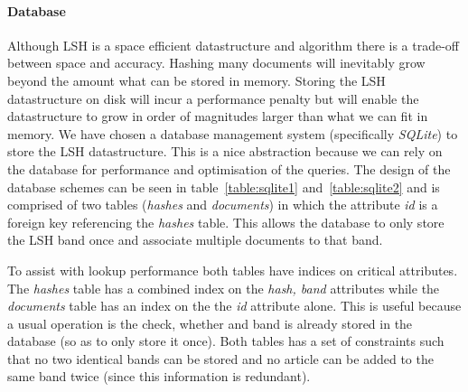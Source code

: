 \paragraph{Database}
Although LSH is a space efficient datastructure and algorithm there is a trade-off between space and accuracy. Hashing many documents will inevitably grow beyond the amount what can be stored in memory. Storing the LSH datastructure on disk will incur a performance penalty but will enable the datastructure to grow in order of magnitudes larger than what we can fit in memory. We have chosen a database management system (specifically \emph{SQLite}) to store the LSH datastructure. This is a nice abstraction because we can rely on the database for performance and optimisation of the queries. The design of the database schemes can be seen in table~\ref{table:sqlite1} and~\ref{table:sqlite2} and is comprised of two tables (\emph{hashes} and \emph{documents}) in which the attribute \emph{id} is a foreign key referencing the \emph{hashes} table. This allows the database to only store the LSH band once and associate multiple documents to that band.

To assist with lookup performance both tables have indices on critical attributes. The \emph{hashes} table has a combined index on the \emph{hash, band} attributes while the \emph{documents} table has an index on the the \emph{id} attribute alone. This is useful because a usual operation is the check, whether and band is already stored in the database (so as to only store it once). Both tables has a set of constraints such that no two identical bands can be stored and no article can be added to the same band twice (since this information is redundant).

